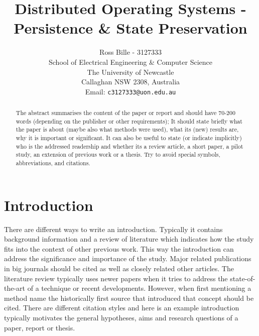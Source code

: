 \documentclass[a4,12pt]{article}
\begin{document}
%
\title{\bf Distributed Operating Systems - Persistence \& State Preservation}
%
\author{Ross Bille - 3127333\\
School of Electrical Engineering \& Computer Science\\
The University of Newcastle\\ Callaghan NSW 2308, Australia\\
Email: \texttt{c3127333@uon.edu.au} } 

\maketitle


\newpage
\begin{abstract}%
\noindent The abstract summarises the content of the paper or report and should have 70-200 words (depending on the publisher or other requirements); It
should state briefly what the paper is about (maybe also what
methods were used), what its (new) results are, why it is
important or significant. It can also be useful to state (or
indicate implicitly) who is the addressed readership and whether
its a review article, a short paper, a pilot study, an
extension of previous work or a thesis. Try to avoid special symbols, abbreviations, and citations.
\end{abstract}

\pagebreak

\tableofcontents

\pagebreak

\section{Introduction}

There are different ways to write an introduction. Typically it
contains background information and a review of literature which
indicates how the study fits into the context of other previous
work. This way the introduction can  address the significance and importance of the study. Major related publications in big journals should be cited
as well as closely related other articles. The literature review typically uses newer papers when it tries to address the state-of-the-art of a technique or recent developments. However, when first mentioning a method name the historically first source that introduced that concept should be cited. There are different citation styles and here is an example introduction
typically motivates the general hypotheses, aims and research questions
of a paper, report or thesis.  
\end{document}
